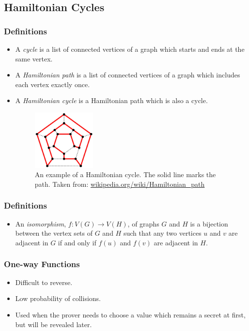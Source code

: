 \documentclass{beamer}
\begin{document}
\subsection{Hamiltonian Cycles}

\begin{frame}
	\frametitle{Definitions}
	\begin{itemize}
		\item A \textit{cycle} is a list of connected vertices of a graph
		which starts and ends at the same vertex. 
		
		\item A \textit{Hamiltonian path} is a list of connected vertices of a
		graph which includes each vertex exactly once.
		
		\item A \textit{Hamiltonian cycle} is a Hamiltonian path which is also
		a cycle.
		
	\begin{figure}
	\centering
	\includegraphics[width=0.30\textwidth]{HCycle.jpg}
	\caption{An example of a Hamiltonian cycle. The solid line marks the path.
	Taken from: \url{wikipedia.org/wiki/Hamiltonian_path}}
	\label{fig:HCycle}
	\end{figure}
		
	\end{itemize}
\end{frame}

\begin{frame}
	\frametitle{Definitions}
	\begin{itemize}
		\item An \textit{isomorphism}, $f: V(G) \rightarrow V(H)$, of graphs 
		$G$ and $H$ is a 
		bijection between the vertex
		sets of $G$ and $H$ such that any two vertices $u$ and $v$ are
		adjacent in $G$ if and only if $f(u)$ and $f(v)$ are adjacent in $H$.
	\end{itemize}
\end{frame}

\begin{frame}
	\frametitle{One-way Functions}
	\begin{itemize}
		
		\item Difficult to reverse.
		
		\item Low probability of collisions.
		
		\item Used when the prover needs to choose a value which remains a secret at first, but will be revealed later.
		
	\end{itemize}
\end{frame}
\end{document}
